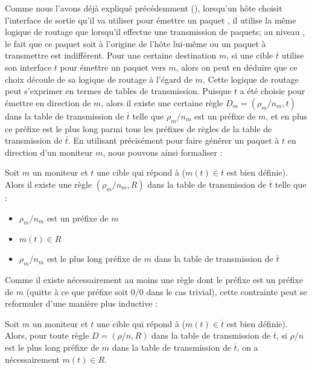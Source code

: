 Comme nous l'avons déjà expliqué précédemment (),
lorsqu'un hôte choisit l'interface de sortie qu'il va utiliser pour émettre un
paquet \icmp, il utilise la même logique de routage que lorsqu'il effectue une
transmission de paquets; au niveau \LLL, le fait que ce paquet soit à l'origine
de l'hôte lui-même ou un paquet à transmettre est indifférent. Pour une certaine
destination $m$, si une cible $\overline{t}$ utilise son interface $t$ pour
émettre un paquet \icmp vers $m$, alors on peut en déduire que ce choix découle
de sa logique de routage à l'égard de $m$. Cette logique de routage peut
s'exprimer en termes de tables de transmission. Puisque $t$ a été choisie pour
émettre en direction de $m$, alors il existe une certaine règle $D_m =
(\rho_m/n_m, t)$ dans la table de transmission de $\overline{t}$ telle que
$\rho_m/n_m$ est un préfixe de $m$, et en plus ce préfixe est le plus long parmi
tous les préfixes de règles de la table de transmission de $\overline{t}$. En
utilisant précisément \udpping pour faire générer un paquet \icmp à $t$ en
direction d'un moniteur $m$, nous pouvons ainsi formaliser :

\begin{proposition}
Soit $m$ un moniteur et $t$ une cible qui répond à \udpping ($m(t) \in
\overline{t}$ est bien définie). Alors il existe une règle $(\rho_m/n_m, R)$
dans la table de transmission de $\overline{t}$ telle que :
\begin{itemize}
  \item $\rho_m/n_m$ est un préfixe de $m$
  \item $m(t) \in R$
  \item $\rho_m/n_m$ est le plus long préfixe de $m$ dans la table de
  transmission de $\overline{t}$
\end{itemize}
\end{proposition}

Comme il existe nécessairement au moins une règle dont le préfixe est un
préfixe de $m$ (quitte à ce que préfixe soit $0/0$ dans le cas trivial), cette
contrainte peut se reformuler d'une manière plus inductive :

\begin{proposition} Soit $m$ un moniteur et $t$ une cible qui répond à \udpping
($m(t) \in \overline{t}$ est bien définie). Alors, pour toute règle $D
= (\rho/n, R)$ dans la table de transmission de $\overline{t}$, si $\rho/n$ est
le plus long préfixe de $m$ dans la table de transmission de $\overline{t}$, on
a nécessairement $m(t) \in R$.
\end{proposition}

